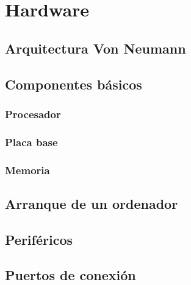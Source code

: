 \chapter{Hardware}

\section{Arquitectura Von Neumann}

\section{Componentes básicos}


\subsection{Procesador}

\subsection{Placa base}

\subsection{Memoria}

\section{Arranque de un ordenador}

\section{Periféricos}

\section{Puertos de conexión}
